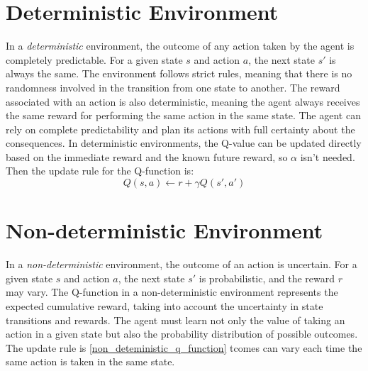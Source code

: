 \section{Deterministic Environment}
In a \textit{deterministic} environment, the outcome of any action taken by the agent is completely predictable.
For a given state \( s \) and action \( a \), the next state \( s' \) is always the same. 
The environment follows strict rules, meaning that there is no randomness involved in the transition from one state to another.
The reward associated with an action is also deterministic, meaning the agent always receives the same reward for performing the same action in the same state.
The agent can rely on complete predictability and plan its actions with full certainty about the consequences.
In deterministic environments, the Q-value can be updated directly based on the immediate reward and the known future reward, so \( \alpha \) isn't needed. 
Then the update rule for the Q-function is:
\begin{equation}
Q(s, a) \leftarrow r + \gamma  Q(s', a')
\label{deteministic_q_function}
\end{equation}

\section{Non-deterministic Environment}
In a \textit{non-deterministic} environment, the outcome of an action is uncertain. For a given state \( s \) and action \( a \), the next state \( s' \) is probabilistic, and the reward \( r \) may vary.
The Q-function in a non-deterministic environment represents the expected cumulative reward, taking into account the uncertainty in state transitions and rewards. The agent must learn not only the value of taking an action in a given state but also the probability distribution of possible outcomes.
The update rule is \ref{non_deteministic_q_function}
tcomes can vary each time the same action is taken in the same state.

